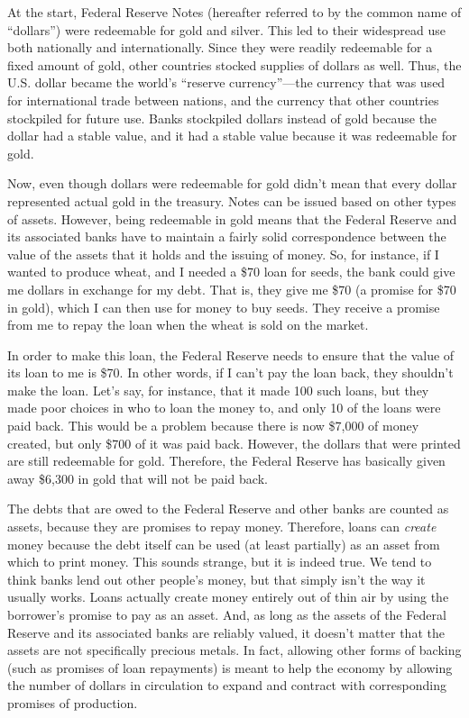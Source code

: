 At the start, Federal Reserve Notes (hereafter referred to by the common
name of “dollars”) were redeemable for gold and silver. This led to
their widespread use both nationally and internationally. Since they
were readily redeemable for a fixed amount of gold, other countries
stocked supplies of dollars as well. Thus, the U.S. dollar became the
world’s “reserve currency”—the currency that was used for international
trade between nations, and the currency that other countries stockpiled
for future use. Banks stockpiled dollars instead of gold because the dollar had a stable value, and it
had a stable value because it was redeemable for gold.

Now, even though dollars were redeemable for gold didn’t mean that every
dollar represented actual gold in the treasury. Notes can be issued
based on other types of assets. However, being redeemable in gold means
that the Federal Reserve and its associated banks have to maintain a fairly solid correspondence
between the value of the assets that it holds and the issuing of money.
So, for instance, if I wanted to produce wheat, and I needed a \$70
loan for seeds, the bank could give me dollars in exchange for my
debt. That is, they give me \$70 (a promise for \$70 in gold), which I
can then use for money to buy seeds. They receive a promise from me to repay the
loan when the wheat is sold on the market. 

In order to make this loan, the Federal Reserve needs to ensure that the
value of its loan to me is \$70. In other words, if I can't pay the loan
back, they shouldn't make the loan.  Let’s say, for instance, that it made
100 such loans, but they made poor choices in who to loan the money to, 
and only 10 of the loans were paid back. This would be a
problem because there is now \$7,000 of money created, but only \$700
of it was paid back. However, the dollars that were printed are still
redeemable for gold. Therefore, the Federal Reserve has basically given
away \$6,300 in gold that will not be paid back. 

The debts that are owed to the Federal Reserve and other banks are counted as assets, 
because they are promises to repay money.  Therefore, loans can \textit{create}
money because the debt itself can be used (at least partially) as an asset from which to print money.
This sounds strange, but it is indeed true.  We tend to think banks lend out
other people's money, but that simply isn't the way it usually works.  Loans actually create money entirely out of 
thin air by using the
borrower's promise to pay as an asset.  And, as long as the assets
of the Federal Reserve and its associated banks are reliably valued, it doesn’t matter
that the assets are not specifically precious metals. In fact, allowing other
forms of backing (such as promises of loan repayments) is meant to help the economy
by allowing the
number of dollars in circulation to expand and contract with
corresponding promises of production. 

